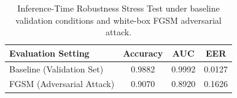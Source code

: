 \begin{table}[htbp]
\centering
\begin{tabular}{|l|c|c|c|}
\hline
\textbf{Evaluation Setting} & \textbf{Accuracy} & \textbf{AUC} & \textbf{EER} \\ \hline
Baseline (Validation Set) & 0.9882 & 0.9992 & 0.0127 \\ \hline
FGSM (Adversarial Attack) & 0.9070 & 0.8920 & 0.1626 \\ \hline
\end{tabular}
\caption{Inference-Time Robustness Stress Test under baseline validation conditions and white-box FGSM adversarial attack.}
\label{tab:fgsm_robustness}
\end{table}
